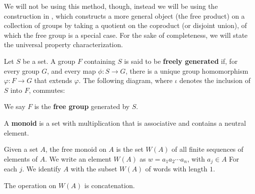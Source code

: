 We will not be using this method, though, instead we will be using the construction in \cite{delaHarpe_topics_in_geometric_group_theory}, which constructs a more general object (the free product) on a collection of groups by taking a quotient on the coproduct (or disjoint union), of which the free group is a special case. For the sake of completeness, we will state the universal property characterization.
\begin{definition}
  Let $S$ be a set. A group $F$ containing $S$ is said to be \textbf{freely generated} if, for every group $G$, and every map $\phi: S\rightarrow G$, there is a unique group homomorphism $\varphi: F\rightarrow G$ that extends $\varphi$. The following diagram, where $\iota$ denotes the inclusion of $S$ into $F$, commutes:
\begin{center}
\end{center}
We say $F$ is the \textbf{free group} generated by $S$.
\end{definition}
\begin{definition}
  A \textbf{monoid} is a set with multiplication that is associative and contains a neutral element.\newline

  Given a set $A$, the free monoid on $A$ is the set $W(A)$ of all finite sequences of elements of $A$. We write an element $W(A)$ as $w = a_1a_2\cdots a_n$, with $a_j\in A$ For each $j$. We identify $A$ with the subset $W(A)$ of words with length $1$.\newline

  The operation on $W(A)$ is concatenation.
\end{definition}


